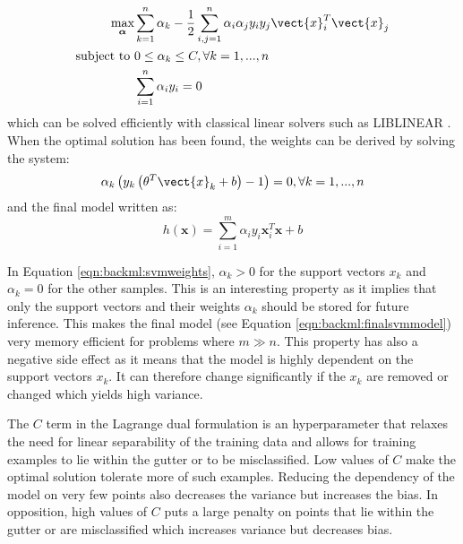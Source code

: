 \begin{align}
\label{eqn:backml:svmoptimizationproblem}
\underset{\boldsymbol{\alpha}}{\text{max}}& \sum_{k=1}^n \alpha_k - \frac{1}{2} \sum_{i,j=1}^n \alpha_i\alpha_j y_i y_j \vect{x}_i^T \vect{x}_j \\
\text{subject to}~& 0 \leq \alpha_k \leq C, \forall k = 1, ..., n \\
& \sum_{i=1}^n \alpha_i y_i = 0
\end{align}
which can be solved efficiently with classical linear solvers such as LIBLINEAR
\cite{fan2008liblinear}. When the optimal solution has been found, the weights
can be derived by solving the system:
\begin{equation}
\label{eqn:backml:svmweights}
\alpha_k\left(y_k \left(\theta^T \vect{x}_k + b\right) - 1\right) = 0, \forall k = 1, ..., n
\end{equation}
and the final model written as:
\begin{equation}
  h(\mathbf{x}) = \sum_{i=1}^m \alpha_i y_i \mathbf{x}_i^T\mathbf{x} + b
  \label{eqn:backml:finalsvmmodel}
\end{equation}

In Equation \ref{eqn:backml:svmweights}, $\alpha_k > 0$ for the support vectors
$x_k$ and $\alpha_k = 0$ for the other samples. This is an interesting property
as it implies that only the support vectors and their weights $\alpha_k$ should
be stored for future inference. This makes the final model (see Equation \ref{eqn:backml:finalsvmmodel}) 
very memory efficient for
problems where $m \gg n$. This property has also a negative side effect as it
means that the model is highly dependent on the support vectors $x_k$. It can
therefore change significantly if the $x_k$ are removed or changed which yields
high variance.

The $C$ term in the Lagrange dual formulation is an hyperparameter that relaxes
the need for linear separability of the training data and allows for training
examples to lie within the gutter or to be misclassified. Low values of $C$ make
the optimal solution tolerate more of such examples. Reducing the dependency of
the model on very few points also decreases the variance but increases the bias.
In opposition, high values of $C$ puts a large penalty on points that lie within
the gutter or are misclassified which increases variance but decreases bias.

